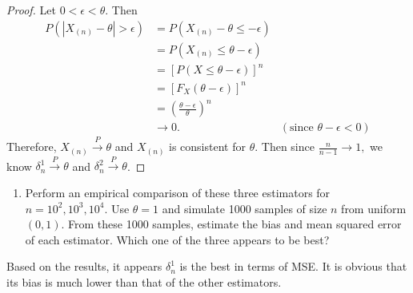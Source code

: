 \documentclass[12pt,]{article}
\providecommand{\tightlist}{%
  \setlength{\itemsep}{0pt}\setlength{\parskip}{0pt}}
\begin{document}
\begin{proof}
Let $0<\epsilon<\theta.$ Then
\begin{align*}
P(|X_{(n)}-\theta|>\epsilon) & = P(X_{(n)} - \theta \le -\epsilon)\\
& = P(X_{(n)} \le \theta - \epsilon)\\
& = [P(X \le \theta - \epsilon)]^n\\
& = [F_X(\theta-\epsilon)]^n\\
& = \left(\frac{\theta-\epsilon}{\theta}\right)^n\\
& \rightarrow 0. & (\text{since } \theta-\epsilon < 0)
\end{align*}
Therefore, $X_{(n)}\overset{P}\rightarrow\theta$ and $X_{(n)}$ is consistent for $\theta.$ Then since $\frac{n}{n-1}\rightarrow 1,$ we know $\delta_n^1\overset{P}\rightarrow\theta$ and $\delta_n^2\overset{P}\rightarrow\theta$.
\end{proof}

\begin{enumerate}
\def\labelenumi{(\alph{enumi})}
\setcounter{enumi}{1}
\tightlist
\item
  Perform an empirical comparison of these three estimators for
  \(n = 10^2, 10^3, 10^4.\) Use \(\theta = 1\) and simulate 1000 samples
  of size \(n\) from uniform \((0,1)\). From these 1000 samples,
  estimate the bias and mean squared error of each estimator. Which one
  of the three appears to be best?
\end{enumerate}

Based on the results, it appears \(\delta_n^1\) is the best in terms of
MSE. It is obvious that its bias is much lower than that of the other
estimators.
\end{document}
